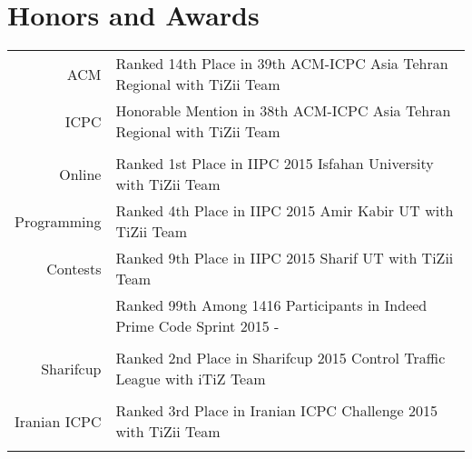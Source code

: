 \documentclass[a4paper,10pt]{article}
\begin{document}
	\section{Honors and Awards}
		\begin{tabular}{r|p{11cm}}
			\textnormal{ACM} & {\small Ranked 14th Place in 39th ACM-ICPC Asia Tehran Regional with TiZii Team} 
			\href{https://icpc.baylor.edu/ICPCID/AW4BCNUI7GGZ}{\footnotesize \faExternalLink} \\
			
			\textnormal{ICPC}& {\small Honorable Mention in 38th ACM-ICPC Asia Tehran Regional with TiZii Team} 
			\href{https://icpc.baylor.edu/ICPCID/AW4BCNUI7GGZ}{\footnotesize \faExternalLink}\\
			\multicolumn{2}{c}{} \\
			
			\textnormal{Online} & {\small Ranked 1st Place in IIPC 2015 Isfahan University with TiZii Team} 
			\href{https://icpc.baylor.edu/ICPCID/AW4BCNUI7GGZ}{\footnotesize \faExternalLink}\\
			
			\textnormal{Programming}& {\small Ranked 4th Place in IIPC 2015 Amir Kabir UT with TiZii Team
				\href{https://icpc.baylor.edu/ICPCID/AW4BCNUI7GGZ}{\footnotesize \faExternalLink}}\\
			
			\textnormal{Contests}& {\small Ranked 9th Place in IIPC 2015 Sharif UT with TiZii Team}
			\href{https://icpc.baylor.edu/ICPCID/AW4BCNUI7GGZ}{\footnotesize \faExternalLink}\\
			
							& {\small Ranked 99th Among 1416 Participants in Indeed Prime Code Sprint 2015}
							\href{https://www.hackerrank.com/indeed-prime-codesprint}{\footnotesize \faExternalLink} - 
							\href{https://www.hackerrank.com/contests/indeed-prime-codesprint/leaderboard/10}{\footnotesize \faExternalLink}\\
			\multicolumn{2}{c}{} \\
			
			\textnormal{Sharifcup} & {\small Ranked 2nd Place in Sharifcup 2015 Control Traffic League with iTiZ Team} 
			\href{http://sharifcup.sharif.ir/#!p=1036}{\footnotesize \faExternalLink}\\
			\multicolumn{2}{c}{} \\

			\textnormal{Iranian ICPC} & {\small Ranked 3rd Place in Iranian ICPC Challenge 2015 with TiZii Team}
			\href{http://icpc.sharif.edu/acmicpc15/challenge-tournament/}{\footnotesize \faExternalLink} \\
			\multicolumn{2}{c}{} \\
			

\end{tabular}
\end{document}
